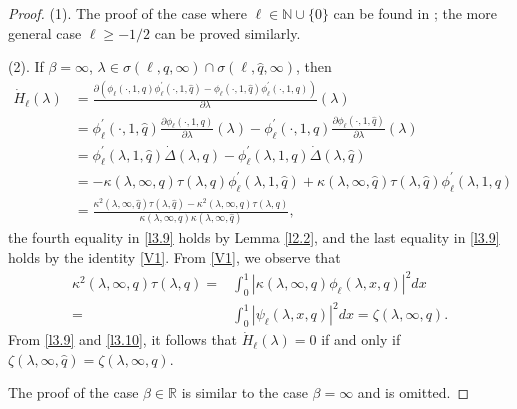 \documentclass[reqno,12pt,centertags]{amsart}
\numberwithin{equation}{section}
\theoremstyle{definition}
\begin{document}
\begin{proof}
(1). The proof of the case where $\ell\in\mathbb{N}\cup\{0\}$ can be found in \cite[Lemma 3.1]{XYB2023}; the more general case $\ell\geq-1/2$ can be proved similarly.

(2). If $\beta=\infty$, $\lambda \in \sigma(\ell, q, \infty) \cap \sigma(\ell, \hat{q}, \infty)$, then
\begin{equation}\label{l3.9}
\begin{split}
\dot{H}_{\ell}(\lambda)
&=\frac{\partial(\phi_{\ell}(\cdot,1,q) \phi_{\ell}^{\prime}(\cdot,1,\hat{q})
-\phi_{\ell}(\cdot,1,\hat{q})\phi_{\ell}^{\prime}(\cdot,1,q))}
{\partial \lambda}(\lambda) \\
&=\phi_{\ell}^{\prime}(\cdot, 1, \hat{q}) 
\frac{\partial\phi_{\ell}(\cdot,1,q)}{\partial\lambda}(\lambda)
-\phi_{\ell}^{\prime}(\cdot, 1, q) 
\frac{\partial\phi_{\ell}(\cdot,1,\hat{q})}{\partial\lambda}(\lambda) \\
&=\phi_{\ell}^{\prime}(\lambda, 1, \hat{q})
\dot{\Delta}(\lambda, q)
-\phi_{\ell}^{\prime}(\lambda, 1, q)
\dot{\Delta}(\lambda, \hat{q}) \\
&=-\kappa(\lambda,\infty,q)\tau(\lambda,q)\phi_{\ell}^{\prime}(\lambda,1,\hat{q})
+\kappa(\lambda,\infty,\hat{q})\tau(\lambda,\hat{q})\phi_{\ell}^{\prime}(\lambda,1,q)\\
&=\frac{\kappa^2(\lambda,\infty,\hat{q})\tau(\lambda,\hat{q})
-\kappa^2(\lambda,\infty,q)\tau(\lambda,q)}
{\kappa(\lambda,\infty,q)\kappa(\lambda,\infty,\hat{q})},
\end{split}
\end{equation}
the fourth equality in \eqref{l3.9} holds by Lemma \ref{l2.2}, and the last equality in \eqref{l3.9} holds by the identity \eqref{V1}. 
From \eqref{V1}, we observe that
\begin{equation}\label{l3.10}
\begin{split}
\kappa^2(\lambda,\infty,q)\tau(\lambda,q)
=&\int_{0}^{1}|\kappa(\lambda,\infty,q)\phi_{\ell}(\lambda,x,q)|^{2}dx\\
=&\int_{0}^{1}|\psi_{\ell}(\lambda, x, q)|^{2}dx=\zeta(\lambda,\infty, q).
\end{split}
\end{equation}
From \eqref{l3.9} and \eqref{l3.10},  it follows that  $\dot{H}_{\ell}(\lambda)=0$ if and only if 
$\zeta(\lambda,\infty, \hat{q})=\zeta(\lambda,\infty,q)$.

The proof of the case $\beta \in \mathbb{R}$ is similar to the case $\beta=\infty$ and is omitted.
\end{proof}
\end{document}
